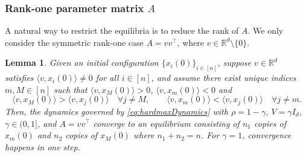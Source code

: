\documentclass[pdflatex,sn-mathphys-num]{sn-jnl}%
\theoremstyle{thmstyleone}%
\newtheorem{lemma}[theorem]{Lemma}
\theoremstyle{thmstyletwo}%
\theoremstyle{thmstylethree}%
\numberwithin{equation}{section}
\newcommand{\R}{\mathbb{R}}
\newcommand{\ip}[2]{\langle #1, #2 \rangle}
\begin{document}
\subsubsection*{Rank-one parameter matrix $A$}

A natural way to restrict the equilibria is to reduce the rank of $A$. We only consider the symmetric rank-one case $A = v v^\top$,  where $v \in \R^d \setminus \{0\}$.

\begin{lemma}\label{lem:rank1-asymptotics}
Given an initial configuration $\{ x_i(0) \}_{i \in [n]}$, suppose $v\in \R^d$ satisfies $\ip{v}{x_i(0)} \neq 0$ for all $i \in [n]$, and assume there exist unique indices $m,M\in [n]$ such that $\ip{v}{x_M(0)} > 0$, $\ip{v}{x_m(0)} < 0$ and 
$$
    \ip{v}{x_M(0)} > \ip{v}{x_j(0)} \quad \forall j \neq M,
    \qquad 
    \ip{v}{x_m(0)} < \ip{v}{x_j(0)} \quad \forall j \neq m.
$$
Then, the dynamics governed by \eqref{eq:hardmaxDynamics} with $\rho = 1 - \gamma$, $V= \gamma I_d$, $\gamma\in (0,1]$, and $A = vv^\top$ converge to an equilibrium consisting of $n_1$ copies of $x_m(0)$ and $n_2$ copies of $x_M(0)$ where $n_1 + n_2 = n$. For $\gamma=1$, convergence happens in one step.
\end{lemma}
\end{document}
